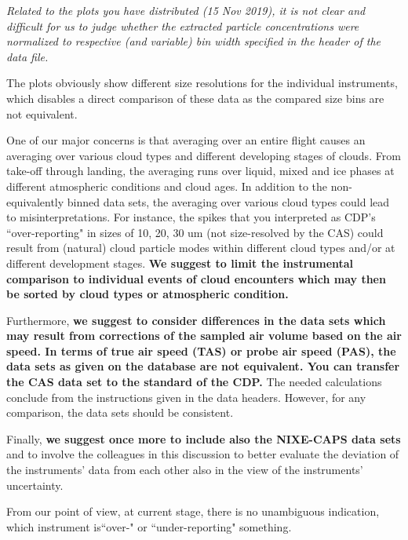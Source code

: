 \documentclass{article}
\begin{document}
{\itshape Related to the plots you have distributed (15 Nov 2019), it is not clear and difficult for us to judge whether the extracted particle concentrations were normalized to respective (and variable) bin width specified in the header of the data file.

The plots obviously show different size resolutions for the individual instruments, which disables a direct comparison of these data as the compared size bins are not equivalent.

One of our major concerns is that averaging over an entire flight causes an averaging over various cloud types and different developing stages of clouds. From take-off through landing, the averaging runs over liquid, mixed and ice phases at different atmospheric conditions and cloud ages. In addition to the non-equivalently binned data sets, the averaging over various cloud types could lead to misinterpretations. For instance, the spikes that you interpreted as CDP’s ``over-reporting" in sizes of 10, 20, 30 um (not size-resolved by the CAS) could result from (natural) cloud particle modes within different cloud types and/or at different development stages. \textbf{We suggest to limit the instrumental comparison to individual events of cloud encounters which may then be sorted by cloud types or atmospheric condition.}

Furthermore, \textbf{we suggest to consider differences in the data sets which may result from corrections of the sampled air volume based on the air speed. In terms of true air speed (TAS) or probe air speed (PAS), the data sets as given on the database are not equivalent. You can transfer the CAS data set to the standard of the CDP.} The needed calculations conclude from the instructions given in the data headers. However, for any comparison, the data sets should be consistent.

Finally, \textbf{we suggest once more to include also the NIXE-CAPS data sets} and to involve the colleagues in this discussion to better evaluate the deviation of the instruments’ data from each other also in the view of the instruments’ uncertainty.

From our point of view, at current stage, there is no unambiguous indication, which instrument is``over-" or ``under-reporting" something.}
\end{document}
